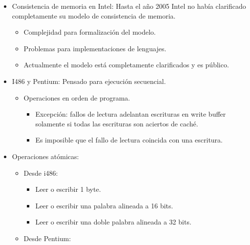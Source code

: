 \documentclass[12pt, twoside, openright]{report} %
\begin{document}
    \begin{itemize}
    
    \item
      Consistencia de memoria en Intel: Hasta el año 2005 Intel no
      había clarificado completamente su modelo de consistencia de
      memoria.

      \begin{itemize}
      
      \item
        Complejidad para formalización del modelo.
      \item
        Problemas para implementaciones de lenguajes.
      \item
        Actualmente el modelo está completamente clarificados y es
        público.
      \end{itemize}
    \item
      I486 y Pentium: Pensado para ejecución secuencial.

      \begin{itemize}
      
      \item
        Operaciones en orden de programa.

        \begin{itemize}
        
        \item
          Excepción: fallos de lectura adelantan escrituras en write
          buffer solamente si todas las escrituras son aciertos de
          caché.
        \item
          Es imposible que el fallo de lectura coincida con una
          escritura.
        \end{itemize}
      \end{itemize}
    \item
      Operaciones atómicas:

      \begin{itemize}
      
      \item
        Desde i486:

        \begin{itemize}
        
        \item
          Leer o escribir 1 byte.
        \item
          Leer o escribir una palabra alineada a 16 bits.
        \item
          Leer o escribir una doble palabra alineada a 32 bits.
        \end{itemize}
      \item
        Desde Pentium:


\end{itemize}
\end{itemize}
\end{document}
